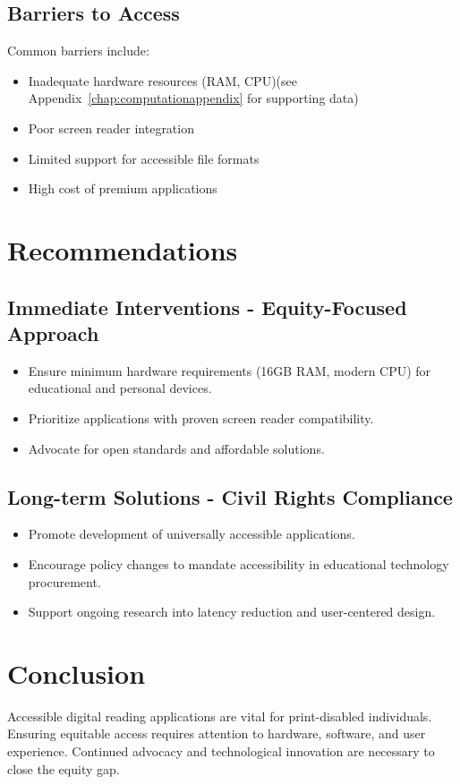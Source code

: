 \subsection{Barriers to Access}
Common barriers include:
\begin{itemize}
	\item Inadequate hardware resources (RAM, CPU)(see Appendix~\ref{chap:computationappendix} for supporting data)\supercite{EquityViolationData}
	\item Poor screen reader integration\supercite{Smith2022, Leporini2004}
	\item Limited support for accessible file formats\supercite{Jones2021, DAISYWiki, CNIBEPUB}
	\item High cost of premium applications\supercite{Lee2019, DolphinScreenreaderPricing}
\end{itemize}

\section{Recommendations}
\subsection{Immediate Interventions - Equity-Focused Approach}
\begin{itemize}
	\item Ensure minimum hardware requirements (16GB RAM, modern CPU) for educational and personal devices\supercite{EducationalEquityReport2024}.
	\item Prioritize applications with proven screen reader compatibility\supercite{WebAIMSurvey}.
	\item Advocate for open standards and affordable solutions\supercite{Stallman2002}.
\end{itemize}

\subsection{Long-term Solutions - Civil Rights Compliance}
\begin{itemize}
	\item Promote development of universally accessible applications\supercite{Burgstahler2015, A11yProject}.
	\item Encourage policy changes to mandate accessibility in educational technology procurement\supercite{Lazar2015, USAccessBoard2018}.
	\item Support ongoing research into latency reduction and user-centered design\supercite{Fowler2011ScreenReaderLatency, RichScreenReaderExperiences}.
\end{itemize}

\section{Conclusion}
Accessible digital reading applications are vital for print-disabled individuals. Ensuring equitable access requires attention to hardware, software, and user experience. Continued advocacy and technological innovation are necessary to close the equity gap\supercite{Kim2023, Brown2022, DiMaggio2001FromUnequalAccess}.
